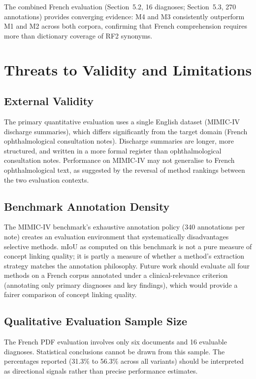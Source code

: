 The combined French evaluation (Section~5.2, 16 diagnoses; Section~5.3, 270 annotations) provides converging evidence: M4 and M3 consistently outperform M1 and M2 across both corpora, confirming that French comprehension requires more than dictionary coverage of RF2 synonyms.

\section{Threats to Validity and Limitations}

\subsection{External Validity}

The primary quantitative evaluation uses a single English dataset (MIMIC-IV discharge summaries), which differs significantly from the target domain (French ophthalmological consultation notes). Discharge summaries are longer, more structured, and written in a more formal register than ophthalmological consultation notes. Performance on MIMIC-IV may not generalise to French ophthalmological text, as suggested by the reversal of method rankings between the two evaluation contexts.

\subsection{Benchmark Annotation Density}

The MIMIC-IV benchmark's exhaustive annotation policy (340 annotations per note) creates an evaluation environment that systematically disadvantages selective methods. mIoU as computed on this benchmark is not a pure measure of concept linking quality; it is partly a measure of whether a method's extraction strategy matches the annotation philosophy. Future work should evaluate all four methods on a French corpus annotated under a clinical-relevance criterion (annotating only primary diagnoses and key findings), which would provide a fairer comparison of concept linking quality.

\subsection{Qualitative Evaluation Sample Size}

The French PDF evaluation involves only six documents and 16 evaluable diagnoses. Statistical conclusions cannot be drawn from this sample. The percentages reported (31.3\% to 56.3\% across all variants) should be interpreted as directional signals rather than precise performance estimates.

